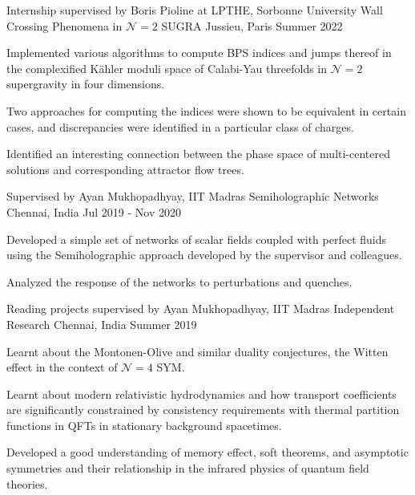 \begin{cventries}
  \cventry
    {Internship supervised by Boris Pioline at LPTHE, Sorbonne University} %
    {Wall Crossing Phenomena in $\mathcal{N}=2$ SUGRA} %
    {Jussieu, Paris} %
    {Summer 2022} %
    {
      \begin{cvitems} %
        \item {Implemented various algorithms to compute BPS indices and jumps thereof in the complexified Kähler moduli space of Calabi-Yau threefolds in $\mathcal{N} = 2$ supergravity in four dimensions.}
        \item {Two approaches for computing the indices were shown to be equivalent in certain cases, and discrepancies were identified in a particular class of charges.}
        \item {Identified an interesting connection between the phase space of multi-centered solutions and corresponding attractor flow trees.}
      \end{cvitems}
    }



\cventry
    {Supervised by Ayan Mukhopadhyay, IIT Madras} %
    {Semiholographic Networks} %
    {Chennai, India} %
    {Jul 2019 - Nov 2020} %
    {
      \begin{cvitems} %
        \item {Developed a simple set of networks of scalar fields coupled with perfect fluids using the Semiholographic approach developed by the supervisor and colleagues.}
        \item {Analyzed the response of the networks to perturbations and quenches.}
      \end{cvitems}
    }


  \cventry
    {Reading projects supervised by Ayan Mukhopadhyay, IIT Madras} %
    {Independent Research} %
    {Chennai, India} %
    {Summer 2019} %
    {
      \begin{cvitems} %
        \item {Learnt about the Montonen-Olive and similar duality conjectures, the Witten effect in the context of $\mathcal{N}=4$ SYM.}
        \item {Learnt about modern relativistic hydrodynamics and how transport coefficients are significantly constrained by consistency requirements with thermal partition functions in QFTs in stationary background spacetimes.}
        \item {Developed a good understanding of memory effect, soft theorems, and asymptotic symmetries and their relationship in the infrared physics of quantum field theories.}
      \end{cvitems}
    }


\end{cventries}

